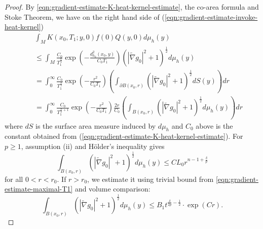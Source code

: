 \documentclass[12pt]{amsart}
\newcommand{\hdel}{\tilde{\nabla}}
\theoremstyle{remark}
\numberwithin{equation}{section}
\begin{document}
\begin{proof}
    By \eqref{eqn:gradient-estimate-K-heat-kernel-estimate}, the co-area formula and Stoke Theorem, we have on the right hand side of (\ref{eqn:gradient-estimate-invoke-heat-kernel})
    \begin{align}\label{eqn:gradient-estimate-Q-heat-kernel-estimate2}
        &\int_{M} K(x_0, T_1; y, 0)f(0)Q(y,0)d\mu_h(y) \nonumber \\
        \quad& \leq \int_{M} \frac{C_0}{T_1^{\frac{n}{2}}}\exp\left(-\frac{d^2_{h_0}(x_0, y)}{C_0 T_1}\right)\left(|\hdel g_0|^2 +1\right)^{\frac{1}{2}}d\mu_h(y) \nonumber \\
        &= \int_0^{\infty} \frac{C_0}{T_1^{\frac{n}{2}}}\exp\left(-\frac{r^2}{C_0 T_1}\right)\left(\int_{\partial B(x_0, r)}\left(|\hdel g_0|^2 + 1\right)^{\frac{1}{2}}dS(y)\right)dr \nonumber \\
        &= \int_0^{\infty} \frac{C_0}{T_1^{\frac{n}{2}+1}}\exp\left(-\frac{r^2}{C_0 T_1}\right)\frac{2r}{C_0}\left(\int_{B(x_0, r)}\left(|\hdel g_0|^2 + 1\right)^{\frac{1}{2}}d\mu_h(y)\right)dr
    \end{align}
    where $dS$ is the surface area measure induced by $d\mu_h$ and $C_0$ above is the constant obtained from (\ref{eqn:gradient-estimate-K-heat-kernel-estimate}). For $p \geq 1$, assumption (ii) and H\"older's inequality gives
    \begin{equation*}
        \int_{B(x_0, r)} \left(|\hdel g_0|^2 + 1\right)^{\frac{1}{2}}d\mu_h(y) \leq CL_0r^{n-1+\frac{\delta}{p}}
    \end{equation*}
    for all $0<r<r_0$. If $r>r_0$, we estimate it using trivial bound from \eqref{eqn:gradient-estimate-maximal-T1} and volume comparison:
     \begin{equation*}
        \int_{B(x_0, r)} \left(|\hdel g_0|^2 + 1\right)^{\frac{1}{2}}d\mu_h(y) \leq  B_1t^{\frac\delta{2p}-\frac12}\cdot \exp\left(Cr\right).
    \end{equation*}
    

\end{proof}
\end{document}
